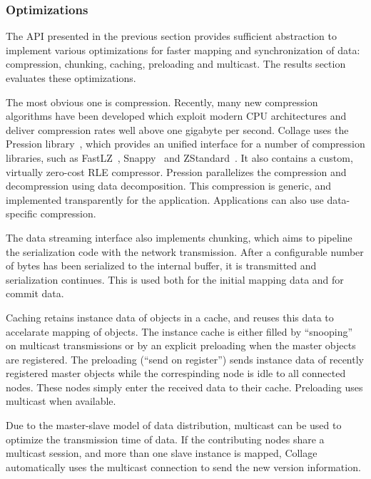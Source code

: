 \documentclass[10pt,journal,compsoc]{IEEEtran}
\begin{document}
\subsubsection{Optimizations}

The API presented in the previous section provides sufficient abstraction to
implement various optimizations for faster mapping and synchronization of data:
compression, chunking, caching, preloading and multicast. The results section
evaluates these optimizations.

The most obvious one is compression. Recently, many new compression algorithms
have been developed which exploit modern CPU architectures and deliver
compression rates well above one gigabyte per second. \textsf{Collage} uses the
Pression library~\cite{pression}, which provides an unified interface for a
number of compression libraries, such as FastLZ~\cite{jesperfast},
Snappy~\cite{snappy} and ZStandard~\cite{zstd}. It also contains a custom,
virtually zero-cost RLE compressor. Pression parallelizes the compression and
decompression using data decomposition. This compression is generic, and
implemented transparently for the application. Applications can also use
data-specific compression.

The data streaming interface also implements chunking, which aims to pipeline
the serialization code with the network transmission. After a configurable
number of bytes has been serialized to the internal buffer, it is transmitted
and serialization continues. This is used both for the initial mapping data and
for commit data.

Caching retains instance data of objects in a cache, and reuses this data to
accelarate mapping of objects. The instance cache is either filled by
``snooping'' on multicast transmissions or by an explicit preloading when the
master objects are registered. The preloading (``send on register'') sends
instance data of recently registered master objects while the correspinding node
is idle to all connected nodes. These nodes simply enter the received data to
their cache. Preloading uses multicast when available.

Due to the master-slave model of data distribution, multicast can be used to
optimize the transmission time of data. If the contributing nodes share a
multicast session, and more than one slave instance is mapped, \textsf{Collage}
automatically uses the multicast connection to send the new version
information.

\end{document}
